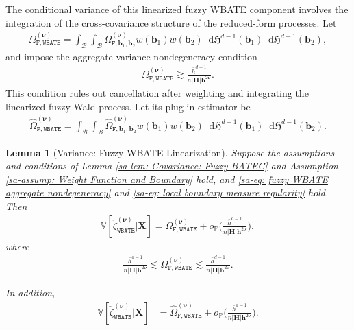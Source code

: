 \documentclass[10pt]{article}
\newtheorem{lem}{Lemma}
\renewcommand{\P}{\mathbb{P}}
\newcommand{\Var}{\mathbb{V}}
\newcommand{\Haus}{\mathfrak{H}}
\newcommand{\dif}{\mathop{}\!\mathrm{d}}
\newcommand{\bb}{\mathbf{b}}
\newcommand{\bh}{\mathbf{h}}
\newcommand{\bH}{\mathbf{H}}
\newcommand{\bX}{\mathbf{X}}
\newcommand{\bnu}{\boldsymbol{\nu}}
\newcommand{\B}{\mathcal{B}}
\begin{document}
The conditional variance of this linearized fuzzy WBATE component involves the integration of the cross-covariance structure of the reduced-form processes. Let
\begin{align*}
    \Omega_{\mathtt{F,WBATE}}^{(\bnu)} = \int_{\B} \int_{\B} \Omega_{\mathtt{F},\bb_1, \bb_2}^{(\bnu)} w(\bb_1) w(\bb_2) \dif\Haus^{d-1}(\bb_1) \dif\Haus^{d-1}(\bb_2),
\end{align*}
and impose the aggregate variance nondegeneracy condition
\begin{align}
    \Omega_{\mathtt{F,WBATE}}^{(\bnu)}
    \gtrsim \frac{\bar{h}^{d-1}}{n|\bH|\bh^{2\bnu}}.
    \label{sa-eq: fuzzy WBATE aggregate nondegeneracy}
\end{align}
This condition rules out cancellation after weighting and integrating the linearized fuzzy Wald process.
Let its plug-in estimator be
\begin{align*}
    \widehat{\Omega}_{\mathtt{F,WBATE}}^{(\bnu)} = \int_{\B} \int_{\B} \widehat{\Omega}_{\mathtt{F},\bb_1, \bb_2}^{(\bnu)} w(\bb_1) w(\bb_2) \dif\Haus^{d-1}(\bb_1) \dif\Haus^{d-1}(\bb_2).
\end{align*}

\begin{lem}[Variance: Fuzzy WBATE Linearization]\label{sa-lem: Fuzzy Integral: Variance}
    Suppose the assumptions and conditions of Lemma \ref{sa-lem: Covariance: Fuzzy BATEC} and Assumption \ref{sa-assump: Weight Function and Boundary} hold, and \eqref{sa-eq: fuzzy WBATE aggregate nondegeneracy} and \eqref{sa-eq: local boundary measure regularity} hold. Then
    \begin{align*}
        \Var[\check{\zeta}_{\mathtt{WBATE}}^{(\bnu)}|\bX]
        = \Omega_{\mathtt{F,WBATE}}^{(\bnu)} + o_{\P}\Big(\frac{\bar{h}^{d-1}}{n|\bH|\bh^{2\bnu}}\Big),
    \end{align*}
    where
    \begin{align*}
        \frac{\bar{h}^{d-1}}{n|\bH|\bh^{2\bnu}}
         \lesssim \Omega_{\mathtt{F,WBATE}}^{(\bnu)}
         \lesssim \frac{\bar{h}^{d-1}}{n|\bH|\bh^{2\bnu}}.
    \end{align*}

    In addition,
    \begin{align*}
        \Var[\check{\zeta}_{\mathtt{WBATE}}^{(\bnu)}|\bX]
        & = \widehat{\Omega}_{\mathtt{F,WBATE}}^{(\bnu)} + o_{\P}\Big(\frac{\bar{h}^{d-1}}{n|\bH|\bh^{2\bnu}}\Big).
    \end{align*}
\end{lem}
\end{document}
